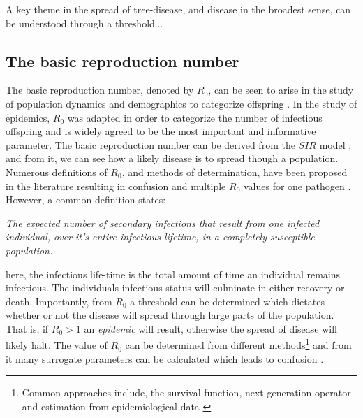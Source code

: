 A key theme in the spread of tree-disease, and disease in the broadest sense, can be understood through a threshold...
\blindtext

\subsection{The basic reproduction number}
\label{ch2:R0}
The basic reproduction number, denoted by $R_0$, can be seen to arise in the study of population dynamics and demographics to categorize offspring \cite{heesterbeek2002brief}. In the study of epidemics, $R_0$ was adapted in order to categorize the number of infectious offspring and is widely agreed to be the most important and informative parameter. The basic reproduction number can be derived from the $SIR$ model \cite{kermack-model}, and from it, we can see how a likely disease is to spread though a population. Numerous definitions of $R_0$, and methods of determination, have been proposed in the literature resulting in confusion and multiple $R_0$ values for one pathogen \cite{delamater2019complexity}. However, a common definition states:

\textit{The expected number of secondary infections that result from one infected individual, over it's entire infectious lifetime, in a completely susceptible population.}

here, the infectious life-time is the total amount of time an individual remains infectious. The individuals infectious status will culminate in either recovery or death. Importantly, from $R_0$ a threshold can be determined which dictates whether or not the disease will spread through large parts of the population. That is, if $R_0>1$ an \textit{epidemic} will result, otherwise the spread of disease will likely halt. The value of $R_0$ can be determined from different methods\footnote{Common approaches include, the survival function, next-generation operator and estimation from epidemiological data \cite{perspectives-on-r0}} and from it many surrogate parameters can be calculated which leads to confusion \cite{diekmann2010construction}.

